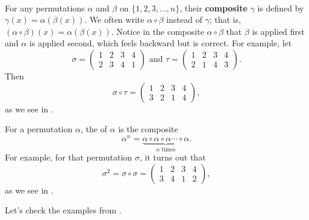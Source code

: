 \begin{defn}
\label{defn_perm_composition}
~
    \begin{apart}
        \item For any permutations $\alpha$ and $\beta$ on $\{1,2,3, \ldots,n\}$, their \textbf{composite} $\gamma$ is defined by $\gamma(x) = \alpha(\beta(x))$.  We often write $\alpha \circ \beta$ instead of $\gamma$; that is, $(\alpha \circ \beta)(x) = \alpha(\beta(x))$. Notice in the composite $\alpha \circ \beta$ that $\beta$ is applied first and $\alpha$ is applied second, which feels backward but is correct.  For example, let
            $$\sigma = \left ( \begin{array} {cccc} 1 & 2 & 3 & 4 \\ 2 & 3 & 4 & 1  \end{array} \right ) \text{ and } \tau= \left ( \begin{array} {cccc} 1 & 2 & 3 & 4\\ 2 & 1 & 4 & 3  \end{array} \right ).$$
       Then 
            $$\sigma \circ \tau = \left ( \begin{array} {cccc} 1 & 2 & 3 & 4 \\ 3 & 2 & 1 & 4 \end{array} \right ),$$ 
        as we see in .

        \item For a permutation $\alpha$, the  of $\alpha$ is the composite 
            $$\alpha^n=\underbrace{\alpha \circ \alpha \circ \alpha \cdots \circ \alpha}_{n \text{ times}}.$$
        For example, for that permutation $\sigma$, it turns out that 
            $$\sigma^2=\sigma \circ \sigma = \left ( \begin{array} {cccc} 1 & 2 & 3 & 4 \\ 3 & 4 & 1 & 2  \end{array} \right ),$$ 
        as we see in .
    \end{apart}
\end{defn}

Let's check the examples from .

